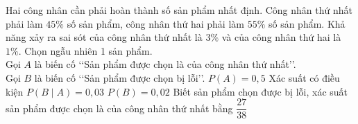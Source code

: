 %

\begin{ex}%
	Hai công nhân cần phải hoàn thành số sản phẩm nhất định. Công nhân thứ nhất phải làm $45\%$ số sản phẩm, công nhân thứ hai phải làm $55\%$ số sản phẩm. Khả năng xảy ra sai sót của công nhân thứ nhất là $3\%$ và của công nhân thứ hai là $1\%$. Chọn ngẫu nhiên 1 sản phẩm.\\
	Gọi $A$ là biến cố \lq\lq Sản phẩm được chọn là của công nhân thứ nhất\rq\rq.\\
	Gọi $B$ là biến cố \lq\lq Sản phẩm được chọn bị lỗi\rq\rq.
	\choiceTF
	{$P(A)=0{,}5$}
	{\True Xác suất có điều kiện $P(B\mid A)=0{,}03$}
	{$P(B)=0{,}02$}
	{Biết sản phẩm chọn được bị lỗi, xác suất sản phẩm được chọn là của công nhân thứ nhất bằng $\dfrac{27}{38}$}
\end{ex}

